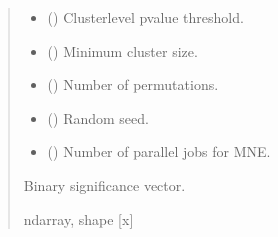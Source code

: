 \documentclass[letterpaper,10pt,english]{sphinxhowto}
\begin{document}
\begin{fulllineitems}
\begin{quote}
\begin{description}
\begin{itemize}
\item {} 
\sphinxAtStartPar
{} (\sphinxstyleliteralemphasis{\sphinxupquote{, }}) \textendash{} Cluster\sphinxhyphen{}level p\sphinxhyphen{}value threshold.

\item {} 
\sphinxAtStartPar
{} (\sphinxstyleliteralemphasis{\sphinxupquote{, }}) \textendash{} Minimum cluster size.

\item {} 
\sphinxAtStartPar
{} (\sphinxstyleliteralemphasis{\sphinxupquote{, }}) \textendash{} Number of permutations.

\item {} 
\sphinxAtStartPar
{} (\sphinxstyleliteralemphasis{\sphinxupquote{, }}) \textendash{} Random seed.

\item {} 
\sphinxAtStartPar
{} (\sphinxstyleliteralemphasis{\sphinxupquote{, }}) \textendash{} Number of parallel jobs for MNE.

\end{itemize}

\sphinxAtStartPar
{} \textendash{} Binary significance vector.

\sphinxAtStartPar
ndarray, shape {[}x{]}

\end{description}\end{quote}

\end{fulllineitems}
\end{document}

